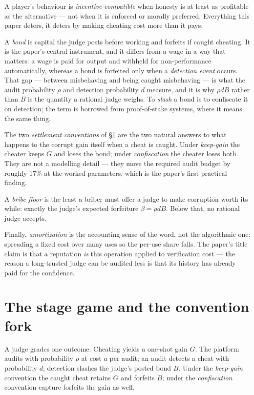\documentclass[11pt,a4paper]{article}
\begin{document}
A player's behaviour is \emph{incentive-compatible} when honesty is at least as profitable as the alternative --- not when
it is enforced or morally preferred. Everything this paper deters, it deters by making cheating cost more than it pays.

A \emph{bond} is capital the judge posts before working and forfeits if caught cheating. It is the paper's central
instrument, and it differs from a wage in a way that matters: a wage is paid for output and withheld for non-performance
automatically, whereas a bond is forfeited only when a \emph{detection event} occurs. That gap --- between misbehaving and
being caught misbehaving --- is what the audit probability $\rho$ and detection probability $d$ measure, and it is why
$\rho d B$ rather than $B$ is the quantity a rational judge weighs. To \emph{slash} a bond is to confiscate it on
detection; the term is borrowed from proof-of-stake systems, where it means the same thing.

The two \emph{settlement conventions} of \S\ref{sec:stage} are the two natural answers to what happens to the corrupt gain
itself when a cheat is caught. Under \emph{keep-gain} the cheater keeps $G$ and loses the bond; under \emph{confiscation}
the cheater loses both. They are not a modelling detail --- they move the required audit budget by roughly 17\% at the
worked parameters, which is the paper's first practical finding.

A \emph{bribe floor} is the least a briber must offer a judge to make corruption worth its while: exactly the judge's
expected forfeiture $\beta = \rho d B$. Below that, no rational judge accepts.

Finally, \emph{amortization} is the accounting sense of the word, not the algorithmic one: spreading a fixed cost over many
uses so the per-use share falls. The paper's title claim is that a reputation \emph{is} this operation applied to
verification cost --- the reason a long-trusted judge can be audited less is that its history has already paid for the
confidence.

\section{The stage game and the convention fork}\label{sec:stage}
A judge grades one outcome. Cheating yields a one-shot gain $G$. The platform audits with probability $\rho$ at cost $a$ per audit; an audit detects a cheat with probability $d$; detection slashes the judge's posted bond $B$. Under the \emph{keep-gain} convention the caught cheat retains $G$ and forfeits $B$; under the \emph{confiscation} convention capture forfeits the gain as well.
\end{document}

